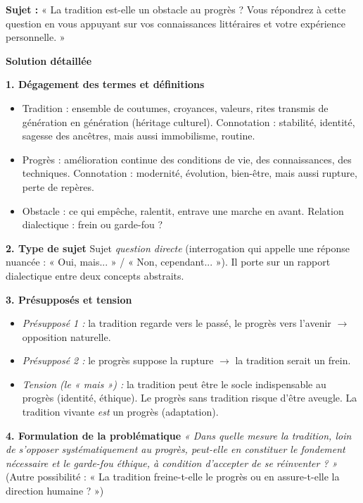 \documentclass[11pt]{article}
\newcommand{\cle}[1]{{\popxbold\color{popdark}#1}}
\begin{document}
\begin{exoresolu}
\textbf{Sujet :} « La tradition est-elle un obstacle au progrès ? Vous répondrez à cette question en vous appuyant sur vos connaissances littéraires et votre expérience personnelle. »

\tcblower
\textbf{Solution détaillée}

\textbf{1. Dégagement des termes et définitions}
\begin{itemize}
    \item \cle{Tradition} : ensemble de coutumes, croyances, valeurs, rites transmis de génération en génération (héritage culturel). Connotation : stabilité, identité, sagesse des ancêtres, mais aussi immobilisme, routine.
    \item \cle{Progrès} : amélioration continue des conditions de vie, des connaissances, des techniques. Connotation : modernité, évolution, bien-être, mais aussi rupture, perte de repères.
    \item \cle{Obstacle} : ce qui empêche, ralentit, entrave une marche en avant. Relation dialectique : frein ou garde-fou ?
\end{itemize}

\textbf{2. Type de sujet}
Sujet \emph{question directe} (interrogation qui appelle une réponse nuancée : « Oui, mais... » / « Non, cependant... »). Il porte sur un rapport dialectique entre deux concepts abstraits.

\textbf{3. Présupposés et tension}
\begin{itemize}
    \item \emph{Présupposé 1 :} la tradition regarde vers le passé, le progrès vers l'avenir $\rightarrow$ opposition naturelle.
    \item \emph{Présupposé 2 :} le progrès suppose la rupture $\rightarrow$ la tradition serait un frein.
    \item \emph{Tension (le « mais ») :} la tradition peut être le socle indispensable au progrès (identité, éthique). Le progrès sans tradition risque d'être aveugle. La tradition vivante \emph{est} un progrès (adaptation).
\end{itemize}

\textbf{4. Formulation de la problématique}
\emph{« Dans quelle mesure la tradition, loin de s'opposer systématiquement au progrès, peut-elle en constituer le fondement nécessaire et le garde-fou éthique, à condition d'accepter de se réinventer ? »}
(Autre possibilité : « La tradition freine-t-elle le progrès ou en assure-t-elle la direction humaine ? »)


\end{exoresolu}
\end{document}
